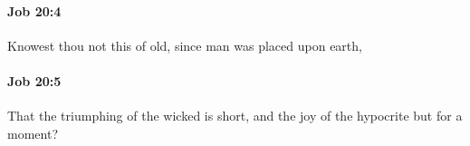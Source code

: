 		\paragraph{Job 20:4} %
			\label{JOB-20-4}

			Knowest thou not this of old, since man was placed upon earth,


		\paragraph{Job 20:5} %
			\label{JOB-20-5}

			That the triumphing of the wicked is short, and the joy of the hypocrite but for a moment?


